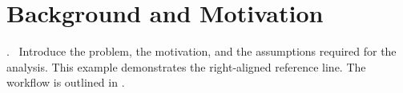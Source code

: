 \section{Background and Motivation}
\label{sec:background}
\begin{block}{\thesection.\ \insertsectionhead}
Introduce the problem, the motivation, and the assumptions required for the
analysis. This example demonstrates the right-aligned reference line.
The workflow is outlined in .
\cite{aghanim2020}
\end{block}
